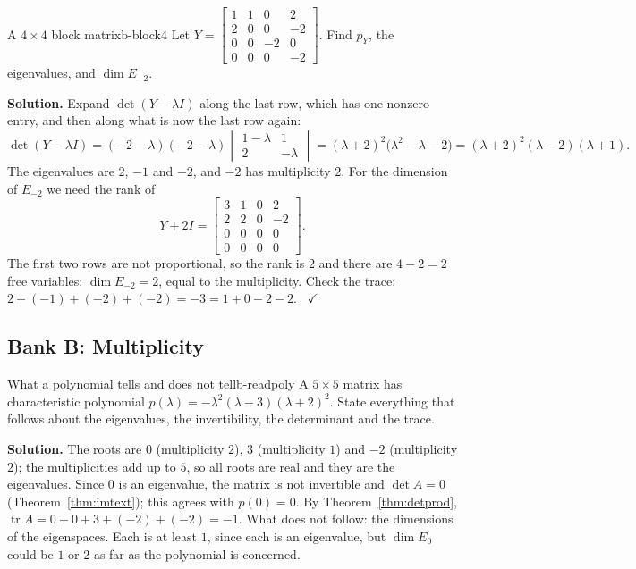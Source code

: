 \documentclass[11pt]{article}
\begin{document}
\begin{exmp}{A $4\times4$ block matrix}{b-block4}
Let $Y=\begin{bmatrix}1&1&0&2\\2&0&0&-2\\0&0&-2&0\\0&0&0&-2\end{bmatrix}$. Find $p_Y$, the eigenvalues, and $\dim E_{-2}$.

\textbf{Solution.} Expand $\det(Y-\lambda I)$ along the last row, which has one nonzero entry, and then along what is now the last row again:
\[
\det(Y-\lambda I)=(-2-\lambda)(-2-\lambda)\begin{vmatrix}1-\lambda&1\\2&-\lambda\end{vmatrix}=(\lambda+2)^2\bigl(\lambda^2-\lambda-2\bigr)=(\lambda+2)^2(\lambda-2)(\lambda+1).
\]
The eigenvalues are $2$, $-1$ and $-2$, and $-2$ has multiplicity $2$. For the dimension of $E_{-2}$ we need the rank of
\[
Y+2I=\begin{bmatrix}3&1&0&2\\2&2&0&-2\\0&0&0&0\\0&0&0&0\end{bmatrix}.
\]
The first two rows are not proportional, so the rank is $2$ and there are $4-2=2$ free variables: $\dim E_{-2}=2$, equal to the multiplicity. Check the trace: $2+(-1)+(-2)+(-2)=-3=1+0-2-2$. \ $\checkmark$
\end{exmp}

\subsection*{Bank B: Multiplicity}
\begin{exmp}{What a polynomial tells and does not tell}{b-readpoly}
A $5\times5$ matrix has characteristic polynomial $p(\lambda)=-\lambda^2(\lambda-3)(\lambda+2)^2$. State everything that follows about the eigenvalues, the invertibility, the determinant and the trace.

\textbf{Solution.} The roots are $0$ (multiplicity $2$), $3$ (multiplicity $1$) and $-2$ (multiplicity $2$); the multiplicities add up to $5$, so all roots are real and they are the eigenvalues. Since $0$ is an eigenvalue, the matrix is not invertible and $\det A=0$ (Theorem~\ref{thm:imtext}); this agrees with $p(0)=0$. By Theorem~\ref{thm:detprod}, $\operatorname{tr}A=0+0+3+(-2)+(-2)=-1$. What does not follow: the dimensions of the eigenspaces. Each is at least $1$, since each is an eigenvalue, but $\dim E_0$ could be $1$ or $2$ as far as the polynomial is concerned.
\end{exmp}
\end{document}
